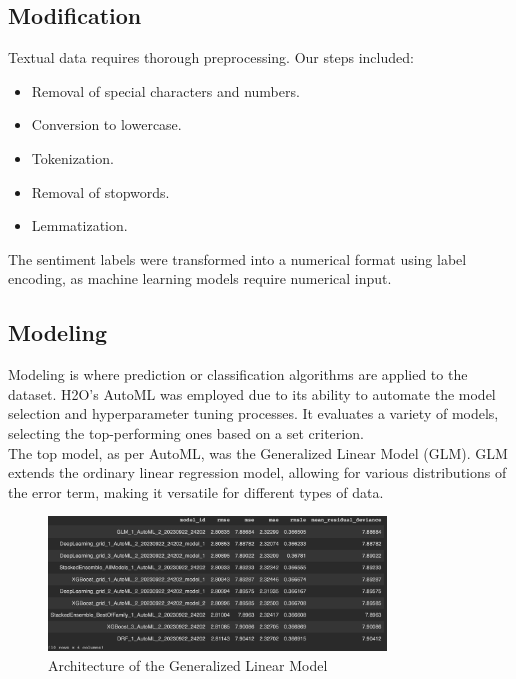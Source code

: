 \documentclass[12pt]{article}
\begin{document}
\subsection{Modification}
Textual data requires thorough preprocessing. Our steps included:
\begin{itemize}
    \item Removal of special characters and numbers.
    \item Conversion to lowercase.
    \item Tokenization.
    \item Removal of stopwords.
    \item Lemmatization.
\end{itemize}
The sentiment labels were transformed into a numerical format using label encoding, as machine learning models require numerical input.

\subsection{Modeling}
Modeling is where prediction or classification algorithms are applied to the dataset. H2O's AutoML was employed due to its ability to automate the model selection and hyperparameter tuning processes. It evaluates a variety of models, selecting the top-performing ones based on a set criterion.\\

The top model, as per AutoML, was the Generalized Linear Model (GLM). GLM extends the ordinary linear regression model, allowing for various distributions of the error term, making it versatile for different types of data.\\

\begin{figure}[h]
\centering
\includegraphics[width=0.8\textwidth]{path_to_glm_architecture.png}
\caption{Architecture of the Generalized Linear Model}
\end{figure}
\end{document}
